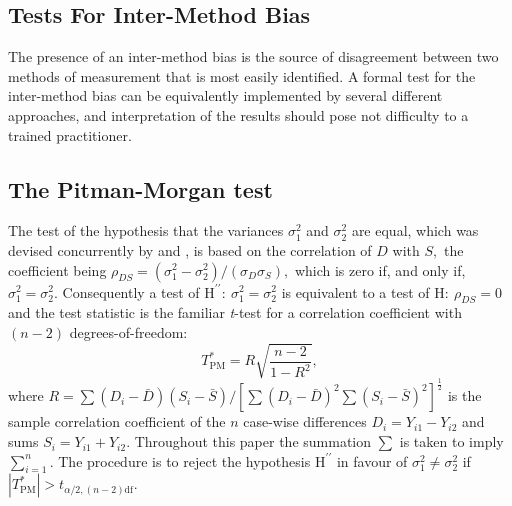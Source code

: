 \documentclass[12pt, a4paper]{report}
\theoremstyle{plain}
\theoremstyle{definition}
\theoremstyle{remark}
\begin{document}


\subsection*{Tests For Inter-Method Bias}
The presence of an inter-method bias is the source of disagreement between two methods of measurement that is most easily identified. A formal test for the inter-method bias can be equivalently implemented by several different approaches, and interpretation of the results should pose not difficulty to a trained practitioner.



\subsection*{The Pitman-Morgan test}

The test of the hypothesis that the variances $\sigma^2_1$ and $\sigma^2_2$ are equal, which was devised concurrently by \cite{pitman} and \cite{morgan}, is based on the correlation of $D$ with $S,$ the coefficient being $\rho_{DS} = (\sigma^2_1 - \sigma^2_2) / (\sigma_D \sigma_S ),$ which is zero if, and only if, $\sigma^2_1 = \sigma^2_2.$ Consequently a test of $\textrm{H}^{\prime\prime}\colon\ \sigma^2_1 = \sigma^2_2$ is equivalent to a test of $\textrm{H}\colon\ \rho_{DS}=0$ and the test statistic is the familiar {\it t}-test for a correlation coefficient with $(n-2)$ degrees-of-freedom:  
\[
T^*_\mathrm{PM} = R \sqrt{ \frac{n-2}{1-R^2} },
\]
where $R =  \sum (D_i-\bar{D})(S_i-\bar{S}) / [ \sum(D_i-\bar{D})^2 \sum (S_i-\bar{S})^2 ]^{\frac{1}{2}} $ 
is the sample correlation coefficient of the $n$ case-wise differences $D_i = Y_{i1} - Y_{i2}$ and sums $S_i = Y_{i1} + Y_{i2}.$ Throughout this paper the summation $\sum$ is taken to imply $\sum_{i=1}^n.$  The procedure is to reject the hypothesis $\textrm{H}^{\prime\prime}$ in favour of $\sigma^2_1\neq\sigma^2_2$ if $|T^*_\mathrm{PM}| >  t_{\alpha/2,(n-2)\textrm{df}}.$ 
\end{document}
